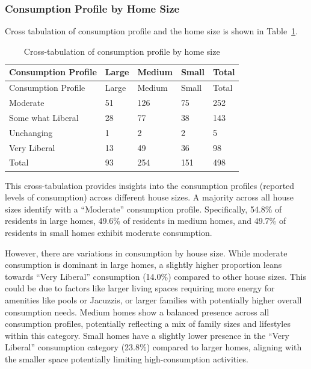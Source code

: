 \documentclass[
  letterpaper,
  DIV=11,
  numbers=noendperiod]{scrartcl}
\begin{document}
\subsubsection{Consumption Profile by Home
Size}\label{consumption-profile-by-home-size}

Cross tabulation of consumption profile and the home size is shown in
Table~\ref{tbl-consumption-profile-home-size}.

\begin{longtable}[]{@{}lllll@{}}
\caption{Cross-tabulation of consumption profile by home
size}\label{tbl-consumption-profile-home-size}\tabularnewline
\toprule\noalign{}
Consumption Profile & Large & Medium & Small & Total \\
\midrule\noalign{}
\endfirsthead
\toprule\noalign{}
Consumption Profile & Large & Medium & Small & Total \\
\midrule\noalign{}
\endhead
\bottomrule\noalign{}
\endlastfoot
Moderate & 51 & 126 & 75 & 252 \\
Some what Liberal & 28 & 77 & 38 & 143 \\
Unchanging & 1 & 2 & 2 & 5 \\
Very Liberal & 13 & 49 & 36 & 98 \\
Total & 93 & 254 & 151 & 498 \\
\end{longtable}

This cross-tabulation provides insights into the consumption profiles
(reported levels of consumption) across different house sizes. A
majority across all house sizes identify with a ``Moderate'' consumption
profile. Specifically, 54.8\% of residents in large homes, 49.6\% of
residents in medium homes, and 49.7\% of residents in small homes
exhibit moderate consumption.

However, there are variations in consumption by house size. While
moderate consumption is dominant in large homes, a slightly higher
proportion leans towards ``Very Liberal'' consumption (14.0\%) compared
to other house sizes. This could be due to factors like larger living
spaces requiring more energy for amenities like pools or Jacuzzis, or
larger families with potentially higher overall consumption needs.
Medium homes show a balanced presence across all consumption profiles,
potentially reflecting a mix of family sizes and lifestyles within this
category. Small homes have a slightly lower presence in the ``Very
Liberal'' consumption category (23.8\%) compared to larger homes,
aligning with the smaller space potentially limiting high-consumption
activities.
\end{document}
